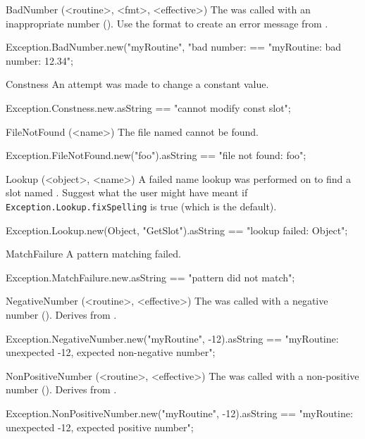 \begin{urbiscriptapi}
\item[BadNumber](<routine>, <fmt>, <effective>)%
  The  was called with an inappropriate number
  ().  Use the format  to create an error
  message from .
\begin{urbiassert}
Exception.BadNumber.new("myRoutine", "bad number: %
  == "myRoutine: bad number: 12.34";
\end{urbiassert}


\item[Constness]%
  An attempt was made to change a constant value.
\begin{urbiassert}
Exception.Constness.new.asString
  == "cannot modify const slot";
\end{urbiassert}


\item[FileNotFound](<name>)%
  The file named  cannot be found.
\begin{urbiassert}
Exception.FileNotFound.new("foo").asString
  == "file not found: foo";
\end{urbiassert}


\item[Lookup](<object>, <name>)%
  A failed name lookup was performed on  to find a slot named
  .  Suggest what the user might have meant if
  \lstinline|Exception.Lookup.fixSpelling| is true (which is the default).
\begin{urbiassert}
Exception.Lookup.new(Object, "GetSlot").asString
  == "lookup failed: Object";
\end{urbiassert}


\item[MatchFailure]%
  A pattern matching failed.
\begin{urbiassert}
Exception.MatchFailure.new.asString
  == "pattern did not match";
\end{urbiassert}


\item[NegativeNumber](<routine>, <effective>)%
  The  was called with a negative number
  ().  Derives from .
\begin{urbiassert}
Exception.NegativeNumber.new("myRoutine", -12).asString
== "myRoutine: unexpected -12, expected non-negative number";
\end{urbiassert}


\item[NonPositiveNumber](<routine>, <effective>)
  The  was called with a non-positive number
  ().  Derives from .
\begin{urbiassert}
Exception.NonPositiveNumber.new("myRoutine", -12).asString
== "myRoutine: unexpected -12, expected positive number";
\end{urbiassert}



\end{urbiscriptapi}
